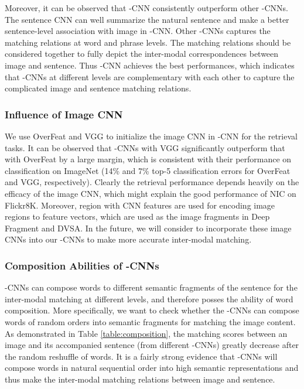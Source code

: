 \documentclass[10pt,twocolumn,letterpaper]{article}
\begin{document}
Moreover, it can be observed that -CNN consistently outperform other -CNNs. The sentence CNN can well summarize the natural sentence and make a better sentence-level association with image in -CNN. Other -CNNs captures the matching relations at word and phrase levels. The matching relations should be considered together to fully depict the inter-modal correspondences between image and sentence. Thus -CNN achieves the best performances, which indicates that -CNNs at different levels are complementary with each other to capture the complicated image and sentence matching relations.

\vspace{-3pt}
\subsubsection {Influence of Image CNN}
\label{sec:experiment:imagecnn}

We use OverFeat and VGG to initialize the image CNN in -CNN for the retrieval tasks. It can be observed that -CNNs with VGG significantly outperform that with OverFeat by a large margin, which is consistent with their performance on classification on ImageNet (14\% and 7\% top-5 classification errors for OverFeat and VGG, respectively). Clearly the retrieval performance depends heavily on the efficacy of the image CNN, which might explain the good performance of NIC on Flickr8K. Moreover, region with CNN features \cite{girshick_cvpr2014} are used for encoding image regions to feature vectors, which are used as the image fragments in Deep Fragment and DVSA. In the future, we will consider to incorporate these image CNNs into our -CNNs to make more accurate inter-modal matching.


\vspace{-2pt}
\subsubsection {Composition Abilities of -CNNs}
\label{sec:experiment:composition}



-CNNs can compose words to different semantic fragments of the sentence for the inter-modal matching at different levels, and therefore posses the ability of word composition. More specifically, we want to check whether the -CNNs can compose words of random orders into semantic fragments for matching the image content. As demonstrated in Table \ref{table:composition}, the matching scores between an image and its accompanied sentence (from different -CNNs) greatly decrease after the random reshuffle of words. It is a fairly strong evidence that -CNNs will compose words in natural sequential order into high semantic representations and thus make the inter-modal matching relations between image and sentence.
\end{document}
